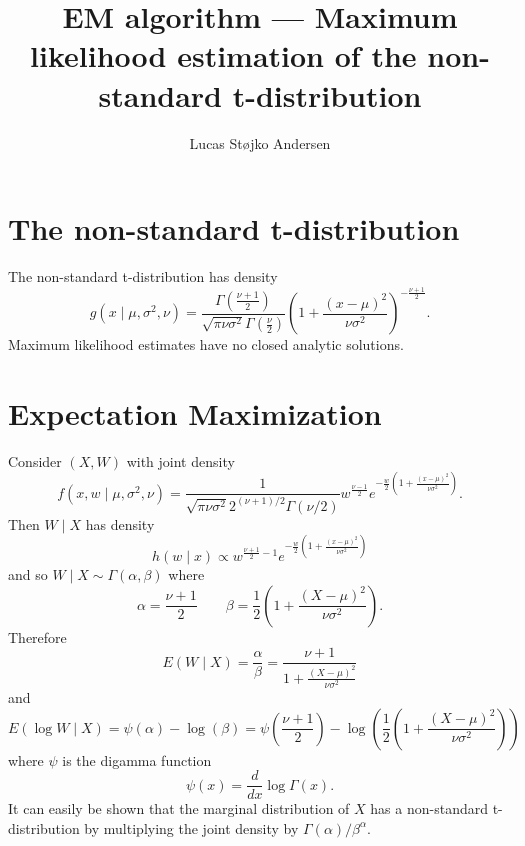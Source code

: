 \documentclass[a4paper,12pt]{article}
\title{EM algorithm --- Maximum likelihood estimation of the non-standard t-distribution}
\author{Lucas Støjko Andersen}
\begin{document}
\maketitle
\section{The non-standard t-distribution}
The non-standard t-distribution has density
\begin{equation}
    \label{eq:marginal}
    g(x\mid\mu,\sigma^2,\nu)=\frac{\Gamma\left(\frac{\nu + 1}{2}\right)}{\sqrt{\pi\nu\sigma^2}\Gamma\left(\frac{\nu}{2}\right)}\left(1+\frac{(x - \mu)^2}{\nu\sigma^2}\right)^{-\frac{\nu + 1}{2}}.
\end{equation}
Maximum likelihood estimates have no closed analytic solutions.
\section{Expectation Maximization}
Consider $(X, W)$ with joint density
\begin{equation}
    \label{eq:join}
    f(x,w\mid \mu,\sigma^2,\nu)=\frac{1}{\sqrt{\pi\nu\sigma^2}2^{(\nu+1)/2}\Gamma(\nu/2)}w^{\frac{\nu - 1}{2}}e^{-\frac{w}{2}\left(1+\frac{(x -\mu)^2}{\nu\sigma^2}\right)}.
\end{equation}
Then $W\mid X$ has density
\begin{equation}
    h(w\mid x)\propto w^{\frac{\nu + 1}{2} - 1}e^{-\frac{w}{2}\left(1+\frac{(x -\mu)^2}{\nu\sigma^2}\right)}
\end{equation}
and so $W\mid X \sim \Gamma(\alpha, \beta)$ where
\begin{equation}
    \alpha = \frac{\nu + 1}{2} \quad\quad 
    \beta = \frac{1}{2}\left(1+\frac{(X -\mu)^2}{\nu\sigma^2}\right).
\end{equation}
Therefore
\begin{equation}
    E(W\mid X) = \frac{\alpha}{\beta} = \frac{\nu + 1}{1+\frac{(X -\mu)^2}{\nu\sigma^2}}
\end{equation}
and
\begin{equation}
    E(\log W \mid X)=\psi(\alpha)-\log(\beta)=\psi\left(\frac{\nu + 1}{2}\right)-\log\left(\frac{1}{2}\left(1+\frac{(X - \mu)^2}{\nu\sigma^2}\right)\right)
\end{equation}
where $\psi$ is the digamma function
\begin{equation}
    \psi(x) = \frac{d}{dx}\log\Gamma(x).
\end{equation}
It can easily be shown that the marginal distribution of $X$ has a non-standard t-distribution by multiplying the joint density by $\Gamma(\alpha)/\beta^{\alpha}$.
\end{document}
